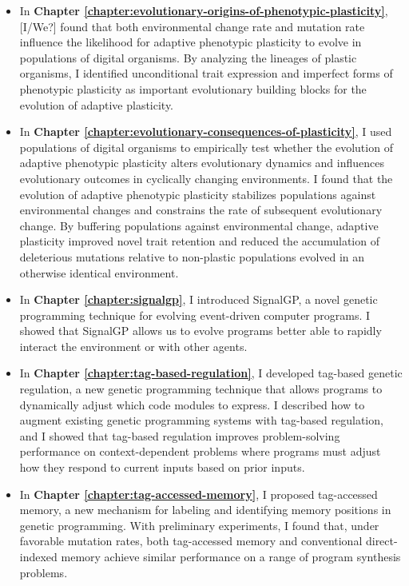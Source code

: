\begin{itemize}
    \item In \textbf{Chapter \ref{chapter:evolutionary-origins-of-phenotypic-plasticity}}, [I/We?] found that both environmental change rate and mutation rate influence the likelihood for adaptive phenotypic plasticity to evolve in populations of digital organisms. 
    By analyzing the lineages of plastic organisms, I identified unconditional trait expression and imperfect forms of phenotypic plasticity as important evolutionary building blocks for the evolution of adaptive plasticity. 
    
    \item In \textbf{Chapter \ref{chapter:evolutionary-consequences-of-plasticity}}, I used populations of digital organisms to empirically test whether the evolution of adaptive phenotypic plasticity alters evolutionary dynamics and influences evolutionary outcomes in cyclically changing environments.
    I found that the evolution of adaptive phenotypic plasticity stabilizes populations against environmental changes and constrains the rate of subsequent evolutionary change.
    By buffering populations against environmental change, adaptive plasticity improved novel trait retention and reduced the accumulation of deleterious mutations relative to non-plastic populations evolved in an otherwise identical environment. 
    
    \item In \textbf{Chapter \ref{chapter:signalgp}}, I introduced SignalGP, a novel genetic programming technique for evolving event-driven computer programs. 
    I showed that SignalGP allows us to evolve programs better able to rapidly interact the environment or with other agents. 
    
    \item In \textbf{Chapter \ref{chapter:tag-based-regulation}}, I developed tag-based genetic regulation, a new genetic programming technique that allows programs to dynamically adjust which code modules to express.
    I described how to augment existing genetic programming systems with tag-based regulation, and I showed that tag-based regulation improves problem-solving performance on context-dependent problems where programs must adjust how they respond to current inputs based on prior inputs.
    
    \item In \textbf{Chapter \ref{chapter:tag-accessed-memory}}, I proposed tag-accessed memory, a new mechanism for labeling and identifying memory positions in genetic programming.  
    With preliminary experiments, I found that, under favorable mutation rates, both tag-accessed memory and conventional direct-indexed memory achieve similar performance on a range of program synthesis problems. 
    
\end{itemize}

